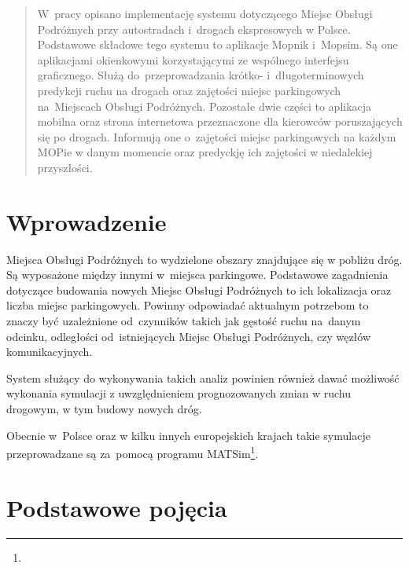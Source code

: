 


\maketitle

\begin{abstract}
  W~pracy opisano implementację systemu dotyczącego Miejsc Obsługi Podróżnych
  przy autostradach i~drogach ekspresowych w Polsce. Podstawowe składowe tego
  systemu to aplikacje Mopnik i~Mopsim. Są one aplikacjami okienkowymi
  korzystającymi ze wspólnego interfejsu graficznego. Służą do~przeprowadzania
  krótko- i~długoterminowych predykcji ruchu na drogach oraz zajętości miejsc
  parkingowych na~Miejscach Obsługi Podróżnych. Pozostałe dwie części to
  aplikacja mobilna oraz strona internetowa przeznaczone dla kierowców
  poruszających się po drogach. Informują one o~zajętości miejsc parkingowych
  na każdym MOPie w danym momencie oraz predyckję ich zajętości w niedalekiej
  przyszłości.  
\end{abstract}

\tableofcontents

\chapter*{Wprowadzenie}

Miejsca Obsługi Podróżnych to wydzielone obszary znajdujące się w pobliżu dróg.
Są wyposażone między innymi w~miejsca parkingowe. Podstawowe zagadnienia
dotyczące budowania nowych Miejsc Obsługi Podróżnych to ich lokalizacja oraz
liczba miejsc parkingowych. Powinny odpowiadać aktualnym potrzebom to znaczy być
uzależnione od~czynników takich jak gęstość ruchu na~danym odcinku, odległości od~istniejących
Miejsc Obsługi Podróżnych, czy węzłów komunikacyjnych. 

System służący do wykonywania takich analiz powinien również dawać
możliwość wykonania symulacji z uwzględnieniem prognozowanych zmian w ruchu
drogowym, w tym budowy nowych dróg.

Obecnie w~Polsce oraz w kilku innych europejskich krajach takie symulacje przeprowadzane są za~pomocą programu
MATSim\footnote{}. %


\chapter{Podstawowe pojęcia}\label{r:pojecia}

